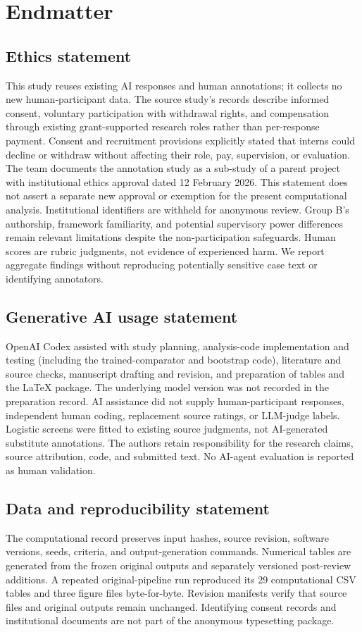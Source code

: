 \documentclass[manuscript,screen,review,anonymous]{acmart}
\begin{document}
\clearpage
\section*{Endmatter}
\subsection*{Ethics statement}
This study reuses existing AI responses and human annotations; it collects no new human-participant data. The source study's records describe informed consent, voluntary participation with withdrawal rights, and compensation through existing grant-supported research roles rather than per-response payment. Consent and recruitment provisions explicitly stated that interns could decline or withdraw without affecting their role, pay, supervision, or evaluation. The team documents the annotation study as a sub-study of a parent project with institutional ethics approval dated 12 February 2026. This statement does not assert a separate new approval or exemption for the present computational analysis. Institutional identifiers are withheld for anonymous review. Group B's authorship, framework familiarity, and potential supervisory power differences remain relevant limitations despite the non-participation safeguards. Human scores are rubric judgments, not evidence of experienced harm. We report aggregate findings without reproducing potentially sensitive case text or identifying annotators.

\subsection*{Generative AI usage statement}
OpenAI Codex assisted with study planning, analysis-code implementation and testing (including the trained-comparator and bootstrap code), literature and source checks, manuscript drafting and revision, and preparation of tables and the LaTeX package. The underlying model version was not recorded in the preparation record. AI assistance did not supply human-participant responses, independent human coding, replacement source ratings, or LLM-judge labels. Logistic screens were fitted to existing source judgments, not AI-generated substitute annotations. The authors retain responsibility for the research claims, source attribution, code, and submitted text. No AI-agent evaluation is reported as human validation.

\subsection*{Data and reproducibility statement}
The computational record preserves input hashes, source revision, software versions, seeds, criteria, and output-generation commands. Numerical tables are generated from the frozen original outputs and separately versioned post-review additions. A repeated original-pipeline run reproduced its 29 computational CSV tables and three figure files byte-for-byte. Revision manifests verify that source files and original outputs remain unchanged. Identifying consent records and institutional documents are not part of the anonymous typesetting package.
\end{document}
